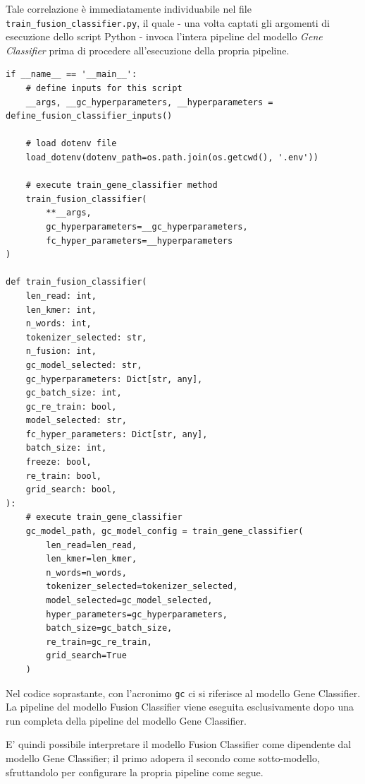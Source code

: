 Tale correlazione è immediatamente individuabile nel file {\small {\color{purple!80} \verb|train_fusion_classifier.py|}}, il quale - una volta captati gli argomenti di esecuzione dello script Python - invoca l'intera pipeline del modello {\em Gene Classifier} prima di procedere all'esecuzione della propria pipeline.

\begin{code}
\label{code:apx:a:python}
\begin{verbatim}
if __name__ == '__main__':
    # define inputs for this script
    __args, __gc_hyperparameters, __hyperparameters = define_fusion_classifier_inputs()

    # load dotenv file
    load_dotenv(dotenv_path=os.path.join(os.getcwd(), '.env'))

    # execute train_gene_classifier method
    train_fusion_classifier(
        **__args,
        gc_hyperparameters=__gc_hyperparameters,
        fc_hyper_parameters=__hyperparameters
)

def train_fusion_classifier(
    len_read: int,
    len_kmer: int,
    n_words: int,
    tokenizer_selected: str,
    n_fusion: int,
    gc_model_selected: str,
    gc_hyperparameters: Dict[str, any],
    gc_batch_size: int,
    gc_re_train: bool,
    model_selected: str,
    fc_hyper_parameters: Dict[str, any],
    batch_size: int,
    freeze: bool,
    re_train: bool,
    grid_search: bool,
):
    # execute train_gene_classifier
    gc_model_path, gc_model_config = train_gene_classifier(
        len_read=len_read,
        len_kmer=len_kmer,
        n_words=n_words,
        tokenizer_selected=tokenizer_selected,
        model_selected=gc_model_selected,
        hyper_parameters=gc_hyperparameters,
        batch_size=gc_batch_size,
        re_train=gc_re_train,
        grid_search=True
    )
\end{verbatim}
\end{code}

Nel codice soprastante, con l'acronimo {\small \verb|gc|} ci si riferisce al modello Gene Classifier. La pipeline del modello Fusion Classifier viene eseguita esclusivamente dopo una run completa della pipeline del modello Gene Classifier.

E' quindi possibile interpretare il modello Fusion Classifier come dipendente dal modello Gene Classifier; il primo adopera il secondo come sotto-modello, sfruttandolo per configurare la propria pipeline come segue.

